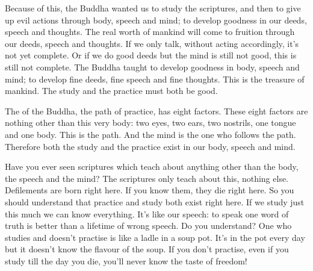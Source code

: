 Because of this, the Buddha wanted us to study the scriptures, and then to give up evil actions through body, speech and mind; to develop goodness in our deeds, speech and thoughts. The real worth of mankind will come to fruition through our deeds, speech and thoughts. If we only talk, without acting accordingly, it's not yet complete. Or if we do good deeds but the mind is still not good, this is still not complete. The Buddha taught to develop goodness in body, speech and mind; to develop fine deeds, fine speech and fine thoughts. This is the treasure of mankind. The study and the practice must both be good. 

The  of the Buddha, the path of practice, has eight factors. These eight factors are nothing other than this very body: two eyes, two ears, two nostrils, one tongue and one body. This is the path. And the mind is the one who follows the path. Therefore both the study and the practice exist in our body, speech and mind. 

Have you ever seen scriptures which teach about anything other than the body, the speech and the mind? The scriptures only teach about this, nothing else. Defilements are born right here. If you know them, they die right here. So you should understand that practice and study both exist right here. If we study just this much we can know everything. It's like our speech: to speak one word of truth is better than a lifetime of wrong speech. Do you understand? One who studies and doesn't practise is like a ladle in a soup pot. It's in the pot every day but it doesn't know the flavour of the soup. If you don't practise, even if you study till the day you die, you'll never know the taste of freedom! 

